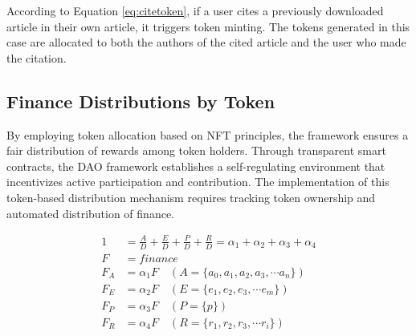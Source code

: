 \documentclass[lettersize,journal]{IEEEtran}
\begin{document}
According to Equation \ref{eq:citetoken}, if a user cites a previously downloaded article in their own article, it triggers token minting. The tokens generated in this case are allocated to both the authors of the cited article and the user who made the citation.



\subsection{Finance Distributions by Token}

By employing token allocation based on NFT principles, the framework ensures a fair distribution of rewards among token holders. Through transparent smart contracts, the DAO framework establishes a self-regulating environment that incentivizes active participation and contribution. The implementation of this token-based distribution mechanism requires tracking token ownership and automated distribution of finance.

\begin{equation}
  \begin{aligned}
    1 &= \frac{A}{D} + \frac{E}{D} + \frac{P}{D} + \frac{R}{D} = \alpha_1 + \alpha_2 + \alpha_3 + \alpha_4 \\
    F &= finance \\
    F_A &= \alpha_1 F \quad (A=\{a_0, a_1, a_2, a_3, \cdots a_n\}) \\
    F_E &= \alpha_2 F \quad (E=\{e_1, e_2, e_3, \cdots e_m\}) \\
    F_P &= \alpha_3 F \quad (P=\{p\}) \\ 
    F_R &= \alpha_4 F \quad (R=\{r_1, r_2, r_3, \cdots r_i\})
  \end{aligned}
  \label{eq:finance}
\end{equation}
\end{document}
